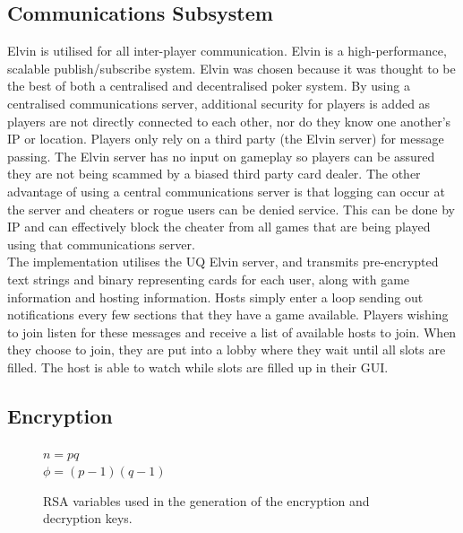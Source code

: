 \documentclass[11pt, oneside]{article}   	%
\begin{document}
\subsection{Communications Subsystem}
\label{sec:comsubsys}				

Elvin is utilised for all inter-player communication. Elvin is a high-performance, scalable publish/subscribe system. Elvin was chosen because it was thought to be the best of both a centralised and decentralised poker system. By using a centralised communications server, additional security for players is added as players are not directly connected to each other, nor do they know one another's IP or location. Players only rely on a third party (the Elvin server) for message passing. The Elvin server has no input on gameplay so players can be assured they are not being scammed by a biased third party card dealer. The other advantage of using a central communications server is that logging can occur at the server and cheaters or rogue users can be denied service. This can be done by IP and can effectively block the cheater from all games that are being played using that communications server.\\

The implementation utilises the UQ Elvin server, and transmits pre-encrypted text strings and binary representing cards for each user, along with game information and hosting information. Hosts simply enter a loop sending out notifications every few sections that they have a game available. Players wishing to join listen for these messages and receive a list of available hosts to join. When they choose to join, they are put into a lobby where they wait until all slots are filled. The host is able to watch while slots are filled up in their GUI.

\subsection{Encryption}
\label{sec:encryption}

\begin{figure}[H]
	\caption{RSA variables used in the generation of the encryption and decryption keys.}
	\vspace{0.2cm} 
  	\centering
	\begin{framed}
		$n=pq$\\$\phi=(p-1)(q-1)$
	\end{framed}
	\vspace{-0.45cm} 
	\label{fig:rsavars}
\end{figure}
\end{document}
